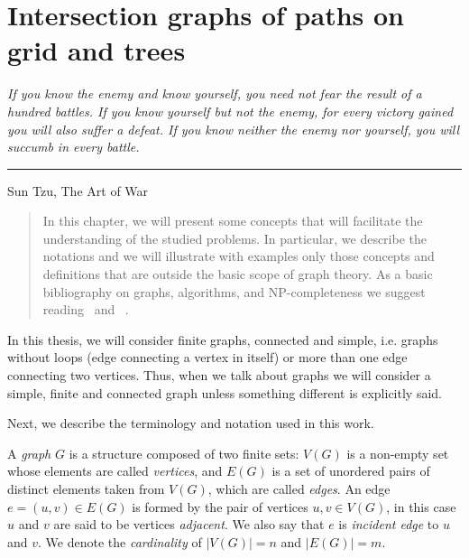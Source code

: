 \chapter{Intersection graphs of paths on grid and trees}\label{Notions}

\vspace{2.5cm}
\begin{flushright}
\begin{minipage}[t][0cm][b]{0.47\textwidth}
\emph{%
If you know the enemy and know yourself, you need not fear the result of a hundred battles. If you know yourself but not the enemy, for every victory gained you will also suffer a defeat. If you know neither the enemy nor yourself, you will succumb in every battle.
}
\end{minipage}

\rule[0cm]{7cm}{0.03cm}%

Sun Tzu, The Art of War
\end{flushright}

\begin{quotation}
In this chapter, we will present some concepts that will facilitate the understanding of the studied problems. In particular, we describe the notations and we will illustrate with examples only those concepts and definitions that are outside the basic scope of graph theory. As a basic bibliography on graphs, algorithms, and NP-completeness we suggest reading~\cite{bondy1976graph} and~\cite{jayme2018} .
\end{quotation}

In this thesis, we will consider finite graphs, connected and simple, i.e. graphs without loops (edge connecting a vertex in itself) or more than one edge connecting two vertices. Thus, when we talk about graphs we will consider a simple, finite and connected graph unless something different is explicitly said.



Next, we describe the terminology and notation used in this work.

A \emph{graph} $ G $ is a structure composed of two finite sets: $ V(G) $ is a non-empty set whose elements are called \emph{vertices}, and $ E(G) $ is a set of unordered pairs of distinct elements taken from $ V(G) $, which are called \emph{edges}. An edge $ e=(u, v) \in E (G) $ is formed by the pair of vertices $ u, v \in V(G) $, in this case $ u $ and $ v $ are said to be vertices \emph{adjacent}. We also say that $ e $ is \emph{incident edge} to $ u $ and $ v $. We denote the \emph{cardinality} of $ |V(G)| = n $ and $ |E(G)| = m $.

